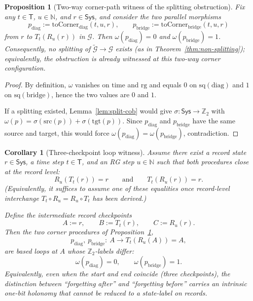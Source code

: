 \documentclass[aps,prl,reprint]{revtex4-2}
\newcommand{\Sys}{\mathsf{Sys}}
\newcommand{\Time}{\mathsf{T}}
\newcommand{\RG}{\mathbb{N}}
\newcommand{\Ztwo}{\mathbb{Z}_2}
\theoremstyle{definition}
\theoremstyle{plain}
\newtheorem{proposition}{Proposition}[section]
\newtheorem{corollary}{Corollary}[section]
\begin{document}
\begin{proposition}[Two-way corner-path witness of the splitting obstruction]
\label{prop:two-way-obstruction}
Fix any $t\in\Time$, $u\in\RG$, and $r\in\Sys$, and consider the two parallel morphisms
\[
p_{\mathrm{diag}}:=\mathrm{toCorner}_{\mathrm{diag}}(t,u,r),\qquad
p_{\mathrm{bridge}}:=\mathrm{toCorner}_{\mathrm{bridge}}(t,u,r)
\]
from $r$ to $T_t(R_u(r))$ in $\mathcal G$.
Then $\omega(p_{\mathrm{diag}})=0$ and $\omega(p_{\mathrm{bridge}})=1$.
Consequently, no splitting of $\widetilde{\mathcal G}\to\mathcal G$ exists (as in Theorem~\ref{thm:non-splitting});
equivalently, the obstruction is already witnessed at this two-way corner configuration.

\end{proposition}

\begin{proof}
By definition, $\omega$ vanishes on $\mathrm{time}$ and $\mathrm{rg}$ and equals $0$ on $\mathrm{sq}(\mathrm{diag})$
and $1$ on $\mathrm{sq}(\mathrm{bridge})$, hence the two values are $0$ and $1$.

If a splitting existed, Lemma~\ref{lem:split-cob} would give $\sigma:\Sys\to\Ztwo$ with
$\omega(p)=\sigma(\mathrm{src}(p))+\sigma(\mathrm{tgt}(p))$. Since $p_{\mathrm{diag}}$ and $p_{\mathrm{bridge}}$
have the same source and target, this would force $\omega(p_{\mathrm{diag}})=\omega(p_{\mathrm{bridge}})$, contradiction.
\end{proof}

\begin{corollary}[Three-checkpoint loop witness]
\label{cor:groundhog-loop}
Assume there exist a record state $r\in\Sys$, a time step $t\in\Time$, and an RG step
$u\in\RG$ such that both procedures close at the record level:
\[
R_u(T_t(r))=r
\qquad\text{and}\qquad
T_t(R_u(r))=r.
\]
(Equivalently, it suffices to assume one of these equalities once record-level
interchange $T_t\!\circ R_u = R_u\!\circ T_t$ has been derived.)

Define the intermediate record checkpoints
\[
A:=r,\qquad B:=T_t(r),\qquad C:=R_u(r).
\]
Then the two corner procedures of Proposition~\ref{prop:two-way-obstruction},
\[
p_{\mathrm{diag}},\ p_{\mathrm{bridge}}:\ A\longrightarrow T_t(R_u(A))=A,
\]
are based loops at $A$ whose $\Ztwo$-labels differ:
\[
\omega(p_{\mathrm{diag}})=0,\qquad \omega(p_{\mathrm{bridge}})=1.
\]
Equivalently, even when the start and end coincide (three checkpoints), the distinction
between ``forgetting after'' and ``forgetting before'' carries an intrinsic one-bit holonomy
that cannot be reduced to a state-label on records.
\end{corollary}
\end{document}
